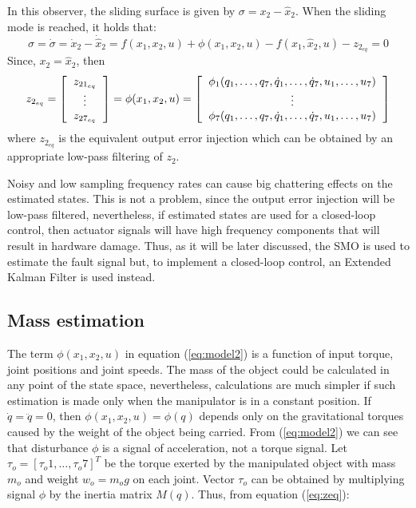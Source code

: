 \documentclass[a4paper, 10pt]{article}
\begin{document}
In this observer, the sliding surface is given by $\sigma = x_2 - \hat{x}_2$. When the sliding mode is reached, it holds that:
\[\sigma = \dot{\sigma} = \dot{x}_2 - \dot{\hat{x}}_2 = f(x_1, x_2, u) + \phi(x_1, x_2, u) - f(x_1, \hat{x}_2, u) - z_{2_{eq}} = 0\]
Since,  $x_2 = \hat{x}_2$, then
\begin{equation}
  z_{2_{eq}} = \left[\begin{tabular}{c}
      $z_{21_{eq}}$\\
      $\vdots$\\
      $z_{27_{eq}}$
    \end{tabular}\right] = \phi(x_1, x_2, u) =
  \left[\begin{tabular}{c}
      $\phi_1(q_1,\dots, q_7, \dot{q}_1, \dots, \dot{q}_7, u_1, \dots,u_7)$\\
      $\vdots$\\
      $\phi_7(q_1,\dots, q_7, \dot{q}_1, \dots, \dot{q}_7, u_1, \dots,u_7)$
    \end{tabular}\right]
  \label{eq:zeq}
\end{equation}
where $z_{2_{eq}}$ is the equivalent output error injection which can be obtained by an appropriate low-pass filtering of $z_2$.

Noisy and low sampling frequency rates can cause big chattering effects on the estimated states. This is not a problem, since the output error injection will be low-pass filtered, nevertheless, if estimated states are used for a closed-loop control, then actuator signals will have high frequency components that will result in hardware damage. Thus, as it will be later discussed, the SMO is used to estimate the fault signal but, to implement a closed-loop control, an Extended Kalman Filter is used instead. 

\subsection{Mass estimation}
\label{sec:MassEstimation}
The term $\phi(x_1, x_2, u)$ in equation (\ref{eq:model2}) is a function of input torque, joint positions and joint speeds. The mass of the object could be calculated in any point of the state space, nevertheless, calculations are much simpler if such estimation is made only when the manipulator is in a constant position. If $\dot{q}= \ddot{q} = 0$, then $\phi(x_1, x_2, u) = \phi(q)$ depends only on the gravitational torques caused by the weight of the object being carried. From (\ref{eq:model2}) we can see that disturbance $\phi$ is a signal of acceleration, not a torque signal. Let $\tau_o = [\tau_o1,\dots,\tau_o7]^T$ be the torque exerted by the manipulated object with mass $m_o$ and weight $w_o=m_o g$ on each joint. Vector $\tau_o$ can be obtained by multiplying signal $\phi$ by the inertia matrix $M(q)$. Thus, from equation (\ref{eq:zeq}):
\end{document}
